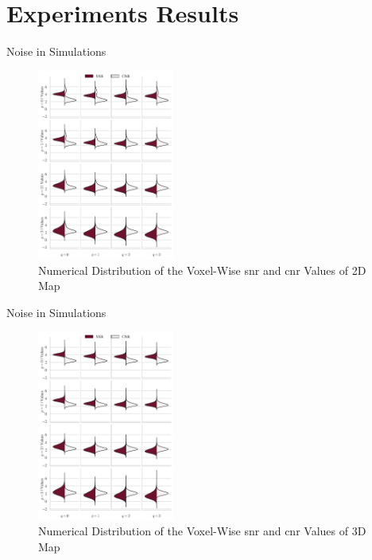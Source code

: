 \documentclass{beamer}
\begin{document}
\section{Experiments Results}


\begin{frame}{Noise in Simulations}
\begin{figure}
\centering
\includegraphics[width=0.4\textwidth]{images/cnrsnr2D.png}
\caption{Numerical Distribution of the Voxel-Wise \gls{snr} and \gls{cnr} Values of 2D Map}
\end{figure}
\end{frame}

\begin{frame}{Noise in Simulations}
\begin{figure}
\centering
\includegraphics[width=0.4\textwidth]{images/cnrsnr3D.png}
\caption{Numerical Distribution of the Voxel-Wise \gls{snr} and \gls{cnr} Values of 3D Map}
\end{figure}
\end{frame}
\end{document}
